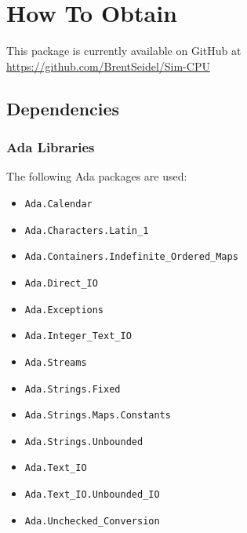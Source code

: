 \documentclass[10pt, openany]{book}
\newcommand{\package}[1]{\texttt{#1}}
\begin{document}
\chapter{How To Obtain}
This package is currently available on GitHub at \url{https://github.com/BrentSeidel/Sim-CPU}

\section{Dependencies}
\subsection{Ada Libraries}
The following Ada packages are used:
\begin{itemize}
  \item \package{Ada.Calendar}
  \item \package{Ada.Characters.Latin\_1}
  \item \package{Ada.Containers.Indefinite\_Ordered\_Maps}
  \item \package{Ada.Direct\_IO}
  \item \package{Ada.Exceptions}
  \item \package{Ada.Integer\_Text\_IO}
  \item \package{Ada.Streams}
   \item \package{Ada.Strings.Fixed}
  \item \package{Ada.Strings.Maps.Constants}
  \item \package{Ada.Strings.Unbounded}
  \item \package{Ada.Text\_IO}
  \item \package{Ada.Text\_IO.Unbounded\_IO}
  \item \package{Ada.Unchecked\_Conversion}
\end{itemize}
\end{document}
